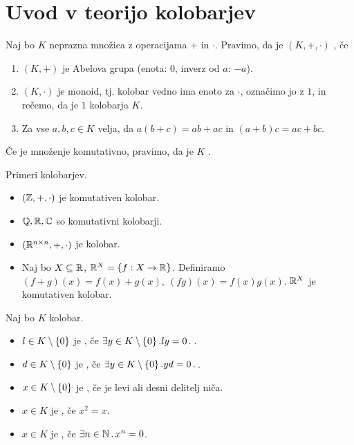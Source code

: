 \section{Uvod v teorijo kolobarjev}

\begin{definicija}
    Naj bo $K$ neprazna množica z operacijama $+$ in $\cdot$. Pravimo, da je $(K, +, \cdot)$ , če
    \begin{enumerate}
        \item $(K, +)$ je Abelova grupa (enota: $0$, inverz od $a$: $-a$).
        \item $(K, \cdot)$ je monoid, tj. kolobar vedno ima enoto za $\cdot$, označimo jo z $1$, in rečemo, da je $1$  kolobarja $K$.
        \item Za vse $a, b, c \in K$ velja, da $a(b+c) = ab+ac$ in $(a+b)c = ac+bc$.
    \end{enumerate}
    Če je množenje komutativno, pravimo, da je $K$ .
\end{definicija}

\begin{zgled}
    Primeri kolobarjev.
    \begin{itemize}
        \item $(\mathbb{Z}, +, \cdot)$ je komutativen kolobar.
        \item $\mathbb{Q}, \mathbb{R}, \mathbb{C}$ so komutativni kolobarji.
        \item $(\mathbb{R}^{n \times n}, +, \cdot)$ je kolobar.
        \item Naj bo $X \subseteq \mathbb{R}$, $\mathbb{R}^X = \left\{f: X \to \mathbb{R}\right\}$. Definiramo $(f+g)(x) = f(x) + g(x), \ (fg)(x) = f(x)g(x)$. $\mathbb{R}^X$ je komutativen kolobar.
    \end{itemize}
\end{zgled}

\begin{definicija}
    Naj bo $K$ kolobar.
    \begin{itemize}
        \item $l \in K \setminus \left\{0\right\}$ je , če $\exists y \in K \setminus \left\{0\right\}. ly = 0 \,.\,$.
        \item $d \in K \setminus \left\{0\right\}$ je , če $\exists y \in K \setminus \left\{0\right\}. yd = 0 \,.\,$.
        \item $x \in K \setminus \left\{0\right\}$ je , če je levi ali desni delitelj niča. 
        \item $x \in K$ je , če $x^2 = x$.
        \item $x \in K$ je , če $\exists n \in \mathbb{N} \,.\, x^n = 0$.
    \end{itemize}
\end{definicija}


